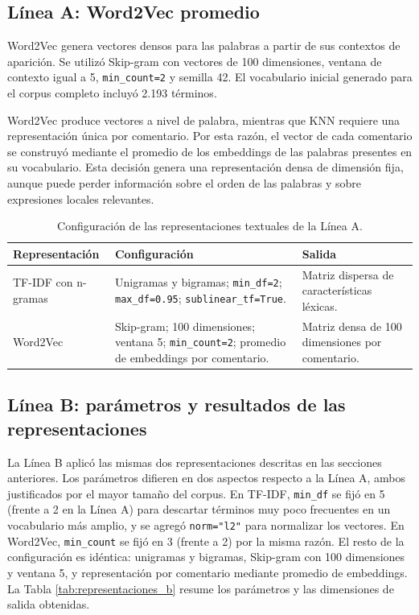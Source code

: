 \documentclass[12pt,a4paper]{article}
\newcommand{\code}[1]{\nolinkurl{#1}}
\begin{document}
\subsection{Línea A: Word2Vec promedio}

Word2Vec genera vectores densos para las palabras a partir de sus contextos de aparición. Se utilizó Skip-gram con vectores de 100 dimensiones, ventana de contexto igual a 5, \code{min\_count=2} y semilla 42. El vocabulario inicial generado para el corpus completo incluyó 2.193 términos.

Word2Vec produce vectores a nivel de palabra, mientras que KNN requiere una representación única por comentario. Por esta razón, el vector de cada comentario se construyó mediante el promedio de los embeddings de las palabras presentes en su vocabulario. Esta decisión genera una representación densa de dimensión fija, aunque puede perder información sobre el orden de las palabras y sobre expresiones locales relevantes.

\begin{table}[htbp]
\centering
\caption{Configuración de las representaciones textuales de la Línea A.}
\label{tab:representaciones_a}
\small
\begin{tabularx}{\textwidth}{@{}P{3.4cm}P{4.7cm}Y@{}}
\toprule
\textbf{Representación} & \textbf{Configuración} & \textbf{Salida} \\
\midrule
TF-IDF con n-gramas & Unigramas y bigramas; \code{min\_df=2}; \code{max\_df=0.95}; \code{sublinear\_tf=True}. & Matriz dispersa de características léxicas. \\
\addlinespace
Word2Vec & Skip-gram; 100 dimensiones; ventana 5; \code{min\_count=2}; promedio de embeddings por comentario. & Matriz densa de 100 dimensiones por comentario. \\
\bottomrule
\end{tabularx}
\end{table}
\FloatBarrier

\subsection{Línea B: parámetros y resultados de las representaciones}

La Línea B aplicó las mismas dos representaciones descritas en las secciones anteriores. Los parámetros difieren en dos aspectos respecto a la Línea A, ambos justificados por el mayor tamaño del corpus. En TF-IDF, \code{min\_df} se fijó en 5 (frente a 2 en la Línea A) para descartar términos muy poco frecuentes en un vocabulario más amplio, y se agregó \code{norm="l2"} para normalizar los vectores. En Word2Vec, \code{min\_count} se fijó en 3 (frente a 2) por la misma razón. El resto de la configuración es idéntica: unigramas y bigramas, Skip-gram con 100 dimensiones y ventana 5, y representación por comentario mediante promedio de embeddings. La Tabla \ref{tab:representaciones_b} resume los parámetros y las dimensiones de salida obtenidas.
\end{document}
